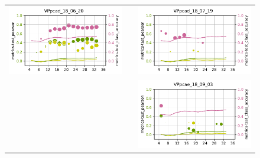\begin{figure}
\begin{tabular}{cc|c}
\includegraphics[width=\subplotwidth]{./figures/csp_spoc_incommon/bubble_csp_spoc_incommon_VPpcad_d2_nolegend}& & \includegraphics[width=\subplotwidth]{./figures/csp_spoc_incommon/bubble_csp_spoc_incommon_VPpcad_d4_nolegend}\\
& & \includegraphics[width=\subplotwidth]{./figures/csp_spoc_incommon/bubble_csp_spoc_incommon_VPpcae_d4_nolegend}\\

\end{tabular}
\end{figure}
